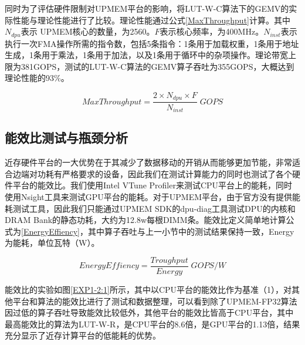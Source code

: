 同时为了评估硬件限制对UPMEM平台的影响，将LUT-W-C算法下的GEMV的实际性能与理论性能进行了比较。理论性能通过公式\ref{MaxThroughput}计算。其中$N_{dpu}$表示 UPMEM核心的数量，为2560。$F$表示核心频率，为400MHz。$N_{inst}$表示执行一次FMA操作所需的指令数，包括5条指令：1条用于加载权重，1条用于地址生成，1条用于乘法，1条用于加法，以及1条用于循环中的杂项操作。理论带宽上限为381GOPS，测试的LUT-W-C算法的GEMV算子吞吐为355GOPS，大概达到理论性能的93\%。

\begin{equation}
    MaxThroughput=\frac{2\times N_{dpu}\times F}{N_{inst}}\; GOPS
    \label{MaxThroughput}
\end{equation}

\subsection{能效比测试与瓶颈分析}
近存硬件平台的一大优势在于其减少了数据移动的开销从而能够更加节能，非常适合边端对功耗有严格要求的设备，因此我们在测试计算能力的同时也测试了各个硬件平台的能效比。我们使用Intel VTune Profiler来测试CPU平台上的能耗，同时使用Nsight工具来测试GPU平台的能耗。对于UPMEM平台，由于官方没有提供能耗测试工具，因此我们只能通过UPMEM SDK的dpu-diag工具测试DPU的内核和DRAM Bank的静态功耗，大约为12.8w每根DIMM条。能效比定义简单地计算公式为\ref{EnergyEffiency}，其中算子吞吐与上一小节中的测试结果保持一致，Energy为能耗，单位瓦特（W）。

\begin{equation}
    EnergyEffiency=\frac{Troughput}{Energy}\; GOPS/W
    \label{EnergyEffiency}
\end{equation}

能效比的实验如图\ref{EXP1-2:1}所示，其中以CPU平台的能效比作为基准（1），对其他平台和算法的能效比进行了测试和数据整理，可以看到除了UPMEM-FP32算法因过低的算子吞吐导致能效比较低外，其他平台的能效比皆高于CPU平台，其中最高能效比的算法为LUT-W-R，是CPU平台的8.6倍，是GPU平台的1.13倍，结果充分显示了近存计算平台的低能耗的优势。

